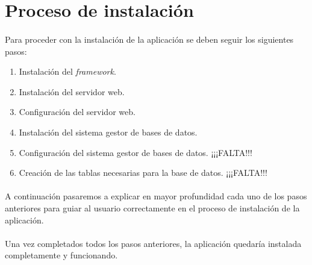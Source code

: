 \section{Proceso de instalación}\label{instalacion}

  \paragraph{}Para proceder con la instalación de la aplicación se deben seguir
  los siguientes pasos:

  \begin{enumerate}
   \item Instalación del \textit{framework}.
   \item Instalación del servidor web.
   \item Configuración del servidor web.
   \item Instalación del sistema gestor de bases de datos.
   \item Configuración del sistema gestor de bases de datos. ¡¡¡FALTA!!!
   \item Creación de las tablas necesarias para la base de datos. ¡¡¡FALTA!!!
  \end{enumerate}

  \paragraph{}A continuación pasaremos a explicar en mayor profundidad cada
  uno de los pasos anteriores para guiar al usuario correctamente en el proceso
  de instalación de la aplicación.

  \begin{enumerate}
    
    
    
    
  \end{enumerate}

  \paragraph{}Una vez completados todos los pasos anteriores, la aplicación
  quedaría instalada completamente y funcionando.